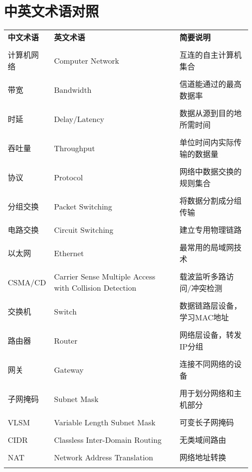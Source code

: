 \documentclass[lang=cn,newtx,10pt,scheme=chinese]{../../elegantbook}
\begin{document}
\section{中英文术语对照}
\begin{longtable}{@{}p{4cm}p{4cm}p{6cm}@{}}
\toprule
\textbf{中文术语} & \textbf{英文术语} & \textbf{简要说明} \\\\ \midrule
\endhead

计算机网络 & Computer Network & 互连的自主计算机集合 \\\\
带宽 & Bandwidth & 信道能通过的最高数据率 \\\\
时延 & Delay/Latency & 数据从源到目的地所需时间 \\\\
吞吐量 & Throughput & 单位时间内实际传输的数据量 \\\\
协议 & Protocol & 网络中数据交换的规则集合 \\\\
分组交换 & Packet Switching & 将数据分割成分组传输 \\\\
电路交换 & Circuit Switching & 建立专用物理链路 \\\\
以太网 & Ethernet & 最常用的局域网技术 \\\\
CSMA/CD & Carrier Sense Multiple Access with Collision Detection & 载波监听多路访问/冲突检测 \\\\
交换机 & Switch & 数据链路层设备，学习MAC地址 \\\\
路由器 & Router & 网络层设备，转发IP分组 \\\\
网关 & Gateway & 连接不同网络的设备 \\\\
子网掩码 & Subnet Mask & 用于划分网络和主机部分 \\\\
VLSM & Variable Length Subnet Mask & 可变长子网掩码 \\\\
CIDR & Classless Inter-Domain Routing & 无类域间路由 \\\\
NAT & Network Address Translation & 网络地址转换 \\\\

\end{longtable}
\end{document}
